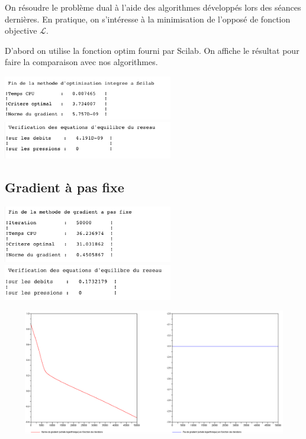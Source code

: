On résoudre le problème dual à l’aide des algorithmes développés lors des séances dernières. En pratique, on s'intéresse à la minimisation de l’opposé de fonction objective $\mathcal{L}$.

D'abord on utilise la fonction optim fourni par Scilab. On affiche le résultat pour faire la comparaison avec nos algorithmes.

\begin{center}
  \includegraphics[width=20em,valign=t]{d_scilab.png}
  \includegraphics[width=20em,valign=t]{d_scilab_v.png}
\end{center}

\subsection{Gradient à pas fixe}

\begin{center}
  \includegraphics[width=20em,valign=t]{d_fixe.png}
  \includegraphics[width=20em,valign=t]{d_fixe_v.png}

  \includegraphics[width=40em,height=15em]{d_fixe_f.png}
\end{center}

